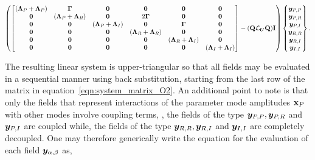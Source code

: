 \begin{widetext}
	\begin{align}
		\label{eqn:system_matrix_O2}
		\left(
		\begin{bmatrix}
			(\mathbf{\Lambda}_{P} + \mathbf{\Lambda}_{P}) & \mathbf{\Gamma} & \mathbf{0} & \mathbf{0} & \mathbf{0} & \mathbf{0} \\ 
			\mathbf{0} & (\mathbf{\Lambda}_{P} + \mathbf{\Lambda}_{R}) & \mathbf{0} & 2\mathbf{\Gamma} & \mathbf{0} & \mathbf{0} \\ 
			\mathbf{0} & \mathbf{0} & (\mathbf{\Lambda}_{P} + \mathbf{\Lambda}_{I}) & \mathbf{0} & \mathbf{\Gamma} & \mathbf{0} \\ 
			\mathbf{0} & \mathbf{0} & \mathbf{0} & (\mathbf{\Lambda}_{R} + \mathbf{\Lambda}_{R}) & \mathbf{0} & \mathbf{0} \\ 
			\mathbf{0} & \mathbf{0} & \mathbf{0} & \mathbf{0} & (\mathbf{\Lambda}_{R} + \mathbf{\Lambda}_{I}) & \mathbf{0} \\ 
			\mathbf{0} & \mathbf{0} & \mathbf{0} & \mathbf{0} & \mathbf{0} & (\mathbf{\Lambda}_{I} + \mathbf{\Lambda}_{I})
		\end{bmatrix} -
		(\mathbf{Q}\mathcal{L}_{\boldsymbol{U}}\mathbf{Q})\mathbf{I}
		\right)
		\begin{Bmatrix}
			\boldsymbol{y}_{P,P} \\
			\boldsymbol{y}_{P,R} \\
			\boldsymbol{y}_{P,I} \\
			\boldsymbol{y}_{R,R} \\
			\boldsymbol{y}_{R,I} \\
			\boldsymbol{y}_{I,I}
		\end{Bmatrix}.
	\end{align}	
\end{widetext}
The resulting linear system is upper-triangular so that all fields may be evaluated in a sequential manner using back substitution, starting from the last row of the matrix in equation~\eqref{eqn:system_matrix_O2}. An additional point to note is that only the fields that represent interactions of the parameter mode amplitudes $\mathbf{x}_{P}$ with other modes involve coupling terms, \ie, the fields of the type $\boldsymbol{y}_{P,P}, \boldsymbol{y}_{P,R}$ and $\boldsymbol{y}_{P,I}$ are coupled while, the fields of the type $\boldsymbol{y}_{R,R}, \boldsymbol{y}_{R,I}$ and $\boldsymbol{y}_{I,I}$ are completely decoupled. One may therefore generically write the equation for the evaluation of each field $\boldsymbol{y}_{\alpha,\beta}$ as,
